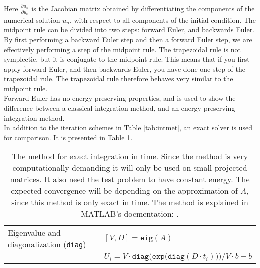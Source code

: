 Here $\frac{\partial u_n}{\partial u_0 }$ is the Jacobian matrix obtained by differentiating the components of the numerical solution $u_n$, with respect to all components of the initial condition. The midpoint rule can be divided into two steps: forward Euler, and backwards Euler. By first performing a backward Euler step and then a forward Euler step, we are effectively performing a step of the midpoint rule. The trapezoidal rule is not symplectic, but it is conjugate to the midpoint rule. This means that if you first apply forward Euler, and then backwards Euler, you have done one step of the trapezoidal rule. The trapezoidal rule therefore behaves very similar to the midpoint rule.\\

\noindent Forward Euler has no energy preserving properties, and is used to show the difference between a classical integration method, and an energy preserving integration method. \\

\noindent In addition to the iteration schemes in Table \ref{tab:intmet}, an exact solver is used for comparison. It is presented in Table \ref{tab:intcorrect}.
\begin{table}

\caption{The method for exact integration in time. Since the method is very computationally demanding it will only be used on small projected matrices. It also need the test problem to have constant energy. The expected convergence will be depending on the approximation of $A$, since this method is only exact in time. The method is explained in MATLAB's docmentation: \cite{expm}. }

\begin{tabular}{l l}
Eigenvalue and diagonalization (\texttt{diag}) & $[V,D] = \texttt{eig}(A)$ \\
 & $U_i = V \cdot \texttt{diag} \Big( \texttt{exp} \big( \texttt{diag}(D \cdot t_i)\big)\Big)/V \cdot b - b$ \\

\end{tabular}

\label{tab:intcorrect} 
\end{table}

